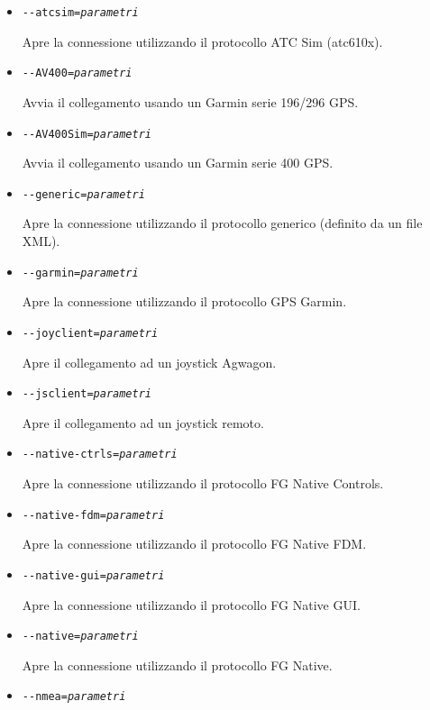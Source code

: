\begin{itemize}
{\begin{itemize}
  \item{\texttt{-$ $-atcsim={\it parametri}}}

    Apre la connessione utilizzando il protocollo ATC Sim (atc610x).

  \item{\texttt{-$ $-AV400={\it parametri}}}

    Avvia il collegamento usando un Garmin  serie 196/296 GPS.

  \item{\texttt{-$ $-AV400Sim={\it parametri}}}

    Avvia il collegamento usando un Garmin serie 400 GPS.

  \item{\texttt{-$ $-generic={\it parametri}}}

    Apre la connessione utilizzando il protocollo generico (definito da un file XML).

  \item{\texttt{-$ $-garmin={\it parametri}}}

    Apre la connessione utilizzando il protocollo GPS Garmin.

  \item{\texttt{-$ $-joyclient={\it parametri}}}

    Apre il collegamento ad un joystick Agwagon.

  \item{\texttt{-$ $-jsclient={\it parametri}}}

    Apre il collegamento ad un joystick remoto.

  \item{\texttt{-$ $-native-ctrls={\it parametri}}}

    Apre la connessione utilizzando il protocollo FG Native Controls.

  \item{\texttt{-$ $-native-fdm={\it parametri}}}

    Apre la connessione utilizzando il protocollo FG Native FDM.

  \item{\texttt{-$ $-native-gui={\it parametri}}}

    Apre la connessione utilizzando il protocollo FG Native GUI.

  \item{\texttt{-$ $-native={\it parametri}}}

    Apre la connessione utilizzando il protocollo FG Native.

  \item{\texttt{-$ $-nmea={\it parametri}}}


\end{itemize}}
\end{itemize}

